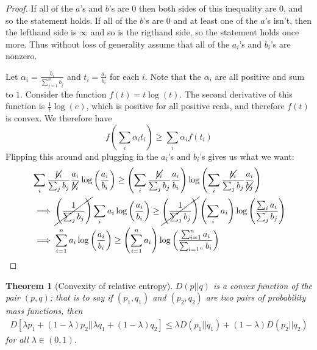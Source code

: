 \documentclass{article}
\theoremstyle{definition}
\theoremstyle{plain}
\newtheorem{theorem}{Theorem}[section]
\begin{document}
\begin{proof}
	If all of the $a$'s and $b$'s are $0$ then both sides of this inequality are $0$, and so the statement holds. If all of the $b$'s are $0$ and at least one of the $a$'s isn't, then the lefthand side is $\infty$ and so is the rigthand side, so the statement holds once more. Thus without loss of generality assume that all of the $a_i$'s and $b_i$'s are nonzero. \par 
	Let $\alpha_i = \frac{b_i}{\sum_{j=1}^n b_j}$ and $t_i = \frac{a_i}{b_i}$ for each $i$. Note that the $\alpha_i$ are all positive and sum to $1$. Consider the function $f(t) = t\log(t)$. The second derivative of this function is $\frac{1}{t}\log(e)$, which is positive for all positive reals, and therefore $f(t)$ is convex. We therefore have 
	\[ f\left(\sum_i \alpha_i t_i \right) \geq \sum_i \alpha_i f(t_i) \]
Flipping this around and plugging in the $a_i$'s and $b_i$'s gives us what we want:
\begin{align}
	& \sum_i \frac{\cancel{b_i}}{\sum_j b_j} \frac{a_i}{\cancel{b_i}} \log\left( \frac{a_i}{b_i} \right) \geq \left( \sum_i \frac{\cancel{b_i}}{\sum_j b_j} \frac{a_i}{b_i} \right)\log\left( \sum_i \frac{\cancel{b_i}}{\sum_j b_j} \frac{a_i}{\cancel{b_j}} \right) \\
	&\implies \cancel{\left(\frac{1}{\sum_j b_j} \right)}\sum_i a_i\log\left(\frac{a_i}{b_i}\right) \geq  \cancel{\left(\frac{1}{\sum_j b_j} \right)}\left(\sum_i a_i \right)\log\left(\frac{\sum_i a_i}{\sum_j b_j}\right) \\
	&\implies \sum_{i=1}^n a_i\log\left(\frac{a_i}{b_i}\right) \geq \left(\sum_{i=1}^n a_i\right)\log\left(\frac{\sum_{i=1}^n a_i}{\sum_{i=1^n}b_i}\right)
\end{align}
\end{proof}	
\begin{theorem}[Convexity of relative entropy]
	$D(p||q)$ is a convex function of the pair $(p,q)$; that is to say if $(p_1,q_1)$ and $(p_2,q_2)$ are two pairs of probability mass functions, then 
\begin{align}
	D[\lambda p_1 + (1-\lambda)p_2 || \lambda q_1 + (1-\lambda)q_2] \leq \lambda D(p_1||q_1) + (1-\lambda)D(p_2||q_2)
\end{align}
for all $\lambda \in (0,1)$. 
\end{theorem}
\end{document}
